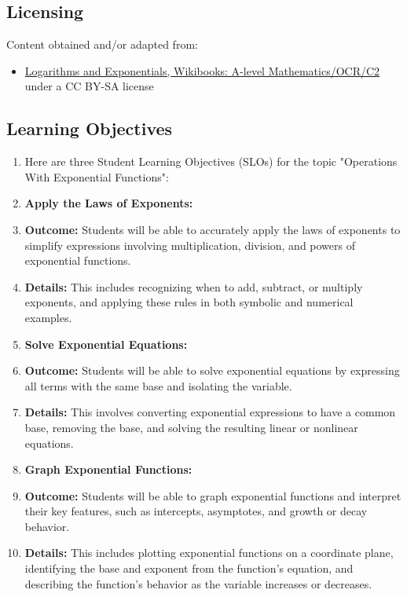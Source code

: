 \subsection{Licensing}
\label{sss:lice-7352}




Content obtained and/or adapted from:



\begin{itemize}
    \item \href{https://en.wikibooks.org/wiki/A-level_Mathematics/OCR/C2/Logarithms_and_Exponentials}{Logarithms and Exponentials, Wikibooks: A-level Mathematics/OCR/C2} under a CC BY-SA license
\end{itemize}


\subsection{Learning Objectives}
\label{ssec:lear-fe6e}


\begin{enumerate}
    \item Here are three Student Learning Objectives (SLOs) for the topic "Operations With Exponential Functions":
    \item \textbf{Apply the Laws of Exponents:}
    \item \textbf{Outcome:} Students will be able to accurately apply the laws of exponents to simplify expressions involving multiplication, division, and powers of exponential functions.
    \item \textbf{Details:} This includes recognizing when to add, subtract, or multiply exponents, and applying these rules in both symbolic and numerical examples.
    \item \textbf{Solve Exponential Equations:}
    \item \textbf{Outcome:} Students will be able to solve exponential equations by expressing all terms with the same base and isolating the variable.
    \item \textbf{Details:} This involves converting exponential expressions to have a common base, removing the base, and solving the resulting linear or nonlinear equations.
    \item \textbf{Graph Exponential Functions:}
    \item \textbf{Outcome:} Students will be able to graph exponential functions and interpret their key features, such as intercepts, asymptotes, and growth or decay behavior.
    \item \textbf{Details:} This includes plotting exponential functions on a coordinate plane, identifying the base and exponent from the function’s equation, and describing the function’s behavior as the variable increases or decreases.
\end{enumerate}


